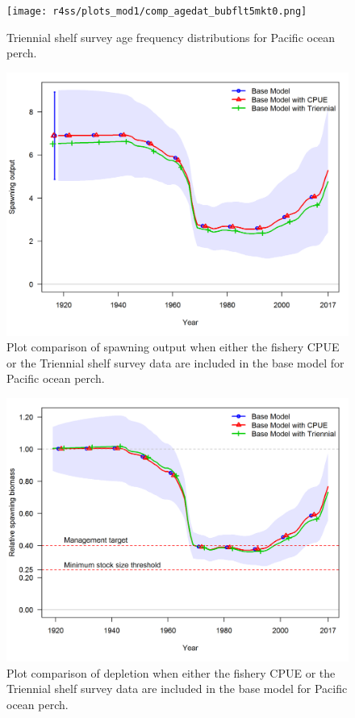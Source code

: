 \documentclass[12pt,]{article}
\begin{document}
\FloatBarrier

\begin{figure}
\centering
\texttt{[image: r4ss/plots\_mod1/comp\_agedat\_bubflt5mkt0.png]}
\caption{Triennial shelf survey age frequency distributions for Pacific
ocean perch. \label{fig:Tri_Age}}
\end{figure}

\FloatBarrier

\begin{figure}
\centering
\includegraphics{Figures/ExcludedData_ssb.png}
\caption{Plot comparison of spawning output when either the fishery CPUE
or the Triennial shelf survey data are included in the base model for
Pacific ocean perch. \label{fig:Excluded_Data_ssb}}
\end{figure}

\FloatBarrier

\begin{figure}
\centering
\includegraphics{Figures/ExcludedData_depl.png}
\caption{Plot comparison of depletion when either the fishery CPUE or
the Triennial shelf survey data are included in the base model for
Pacific ocean perch. \label{fig:Excluded_Data_depl}}
\end{figure}
\end{document}
